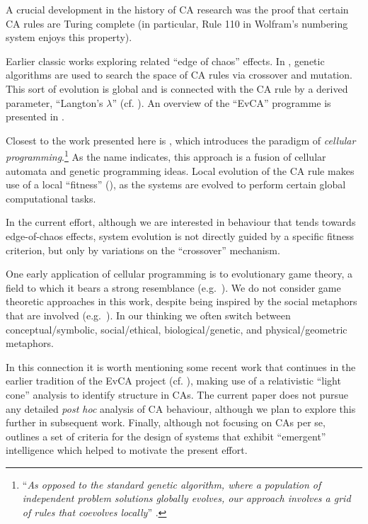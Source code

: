A crucial development in the history of CA research was the proof
\cite{cook2004universality} that certain CA rules are Turing complete
(in particular, Rule 110 in Wolfram's numbering system
\cite{wolfram1994cellular} enjoys this property).

Earlier classic works
\cite{langton1990computation,mitchell1993revisiting,packard1988adaptation}
exploring related ``edge of chaos'' effects.  In
\cite{packard1988adaptation,mitchell1993revisiting,mitchell1994evolving},
genetic algorithms are used to search the space of CA rules via
crossover and mutation.  This sort of evolution is global and is
connected with the CA rule by a derived parameter, ``Langton's
$\lambda$'' (cf. \cite{langton1990computation}).  An overview of the
``EvCA'' programme is presented in \cite{hordijk2013evca}.

Closest to the work presented here is \cite{sipper1997evolution},
which introduces the paradigm of \emph{cellular
  programming}.\footnote{``\emph{As opposed to the standard genetic
    algorithm, where a population of independent problem solutions
    globally evolves, our approach involves a grid of rules that
    coevolves locally}'' \cite[p. 74]{sipper1997evolution}.}  As the
name indicates, this approach is a fusion of cellular automata and
genetic programming ideas.  Local evolution of the CA rule makes use
of a local ``fitness'' (\cite[pp. 79--81]{sipper1997evolution}), as
the systems are evolved to perform certain global computational tasks.

In the current effort, although we are interested in behaviour that
tends towards edge-of-chaos effects, system evolution is not directly
guided by a specific fitness criterion, but only by variations on the
``crossover'' mechanism.

One early application of cellular programming is to evolutionary game
theory, a field to which it bears a strong resemblance
(e.g.~\cite{nowak1992evolutionary}).  We do not consider game
theoretic approaches in this work, despite being inspired by the
social metaphors that are involved (e.g.~\cite{nowak2006five}).  In
our thinking we often switch between conceptual/symbolic,
social/ethical, biological/genetic, and physical/geometric metaphors.

In this connection it is worth mentioning some recent work
\cite{goerg2012licors,goerg2012mixed} that continues in the earlier
tradition of the EvCA project (cf. \cite{hordijk2001upper}), making
use of a relativistic ``light cone'' analysis to identify structure in
CAs.  The current paper does not pursue any detailed \emph{post hoc}
analysis of CA behaviour, although we plan to explore this further in
subsequent work.  Finally, although not focusing on CAs per se,
\cite{hofstadter1995prolegomena} outlines a set of criteria for the
design of systems that exhibit ``emergent'' intelligence which helped
to motivate the present effort.


